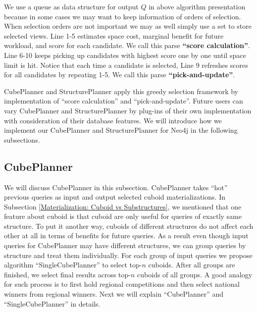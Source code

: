 We use a queue as data structure for output $Q$ in above algorithm presentation because in some cases we may want to keep information of orders of selection. When selection orders are not important we may as well simply use a set to store selected views. Line 1-5 estimates space cost, marginal benefit for future workload, and score for each candidate. We call this parse  \textbf{``score calculation''}. Line 6-10 keeps picking up candidates with highest score one by one until space limit is hit. Notice that each time a candidate is selected, Line 9 refreshes scores for all candidates by repeating 1-5. We call this parse \textbf{``pick-and-update''}.   

CubePlanner and StructurePlanner apply this greedy selection framework by implementation of ``score calculation'' and ``pick-and-update''. Future users can vary CubePlanner and StructurePlanner by plug-ins of their own implementation with consideration of their database features. We will introduce how we implement our CubePlanner and StructurePlanner for Neo4j in the following subsections.

\subsection{CubePlanner}

We will discuss CubePlanner in this subsection. CubePlanner takes ``hot'' previous queries as input and output selected cuboid materializations. In Subsection \ref{Materialization: Cuboid vs Substructures}, we mentioned that one feature about cuboid is that cuboid are only useful for queries of exactly same structure. To put it another way, cuboids of different structures do not affect each other at all in terms of benefits for future queries. As a result even though input queries for CubePlanner may have different structures, we can group queries by structure and treat them individually. For each group of input queries we propose algorithm ``SingleCubePlanner'' to select top-$n$ cuboids. After all groups are finished, we select final results across top-$n$ cuboids of all groups. A good analogy for such process is to first hold regional competitions and then select national winners from regional winners. Next we will explain ``CubePlanner'' and ``SingleCubePlanner'' in details.

